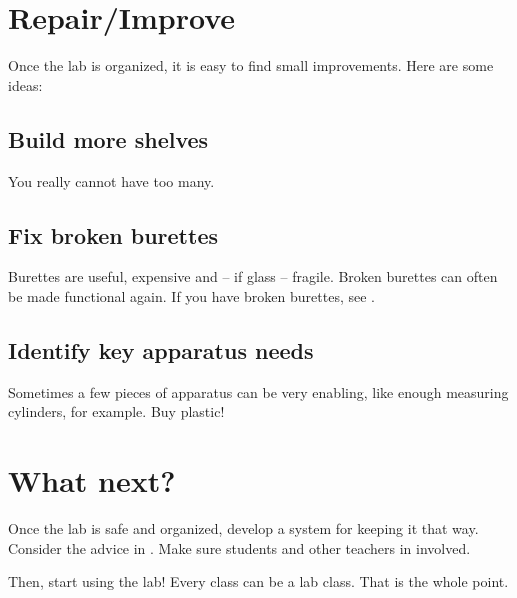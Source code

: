\section{Repair/Improve}

Once the lab is organized, 
it is easy to find small improvements. 
Here are some ideas:

\subsection{Build more shelves}
You really cannot have too many.

\subsection{Fix broken burettes}
Burettes are useful, 
expensive and -- if glass -- fragile. 
Broken burettes can often be made functional again. 
If you have broken burettes, 
see .

\subsection{Identify key apparatus needs}
Sometimes a few pieces of apparatus can be very enabling, 
like enough measuring cylinders, 
for example. 
Buy plastic!

\section{What next?}

Once the lab is safe and organized, 
develop a system for keeping it that way. 
Consider the advice in . 
Make sure students and other teachers in involved.

Then, 
start using the lab! Every class can be a lab class. 
That is the whole point.
